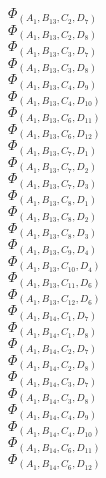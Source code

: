 \documentclass[14pt]{article}
\begin{document}
    $\Phi_{({A}_{1}, {B}_{13}, {C}_{2}, {D}_{7})}$ \\ 
    $\Phi_{({A}_{1}, {B}_{13}, {C}_{2}, {D}_{8})}$ \\ 
    $\Phi_{({A}_{1}, {B}_{13}, {C}_{3}, {D}_{7})}$ \\ 
    $\Phi_{({A}_{1}, {B}_{13}, {C}_{3}, {D}_{8})}$ \\ 
    $\Phi_{({A}_{1}, {B}_{13}, {C}_{4}, {D}_{9})}$ \\ 
    $\Phi_{({A}_{1}, {B}_{13}, {C}_{4}, {D}_{10})}$ \\ 
    $\Phi_{({A}_{1}, {B}_{13}, {C}_{6}, {D}_{11})}$ \\ 
    $\Phi_{({A}_{1}, {B}_{13}, {C}_{6}, {D}_{12})}$ \\ 
    $\Phi_{({A}_{1}, {B}_{13}, {C}_{7}, {D}_{1})}$ \\ 
    $\Phi_{({A}_{1}, {B}_{13}, {C}_{7}, {D}_{2})}$ \\ 
    $\Phi_{({A}_{1}, {B}_{13}, {C}_{7}, {D}_{3})}$ \\ 
    $\Phi_{({A}_{1}, {B}_{13}, {C}_{8}, {D}_{1})}$ \\ 
    $\Phi_{({A}_{1}, {B}_{13}, {C}_{8}, {D}_{2})}$ \\ 
    $\Phi_{({A}_{1}, {B}_{13}, {C}_{8}, {D}_{3})}$ \\ 
    $\Phi_{({A}_{1}, {B}_{13}, {C}_{9}, {D}_{4})}$ \\ 
    $\Phi_{({A}_{1}, {B}_{13}, {C}_{10}, {D}_{4})}$ \\ 
    $\Phi_{({A}_{1}, {B}_{13}, {C}_{11}, {D}_{6})}$ \\ 
    $\Phi_{({A}_{1}, {B}_{13}, {C}_{12}, {D}_{6})}$ \\ 
    $\Phi_{({A}_{1}, {B}_{14}, {C}_{1}, {D}_{7})}$ \\ 
    $\Phi_{({A}_{1}, {B}_{14}, {C}_{1}, {D}_{8})}$ \\ 
    $\Phi_{({A}_{1}, {B}_{14}, {C}_{2}, {D}_{7})}$ \\ 
    $\Phi_{({A}_{1}, {B}_{14}, {C}_{2}, {D}_{8})}$ \\ 
    $\Phi_{({A}_{1}, {B}_{14}, {C}_{3}, {D}_{7})}$ \\ 
    $\Phi_{({A}_{1}, {B}_{14}, {C}_{3}, {D}_{8})}$ \\ 
    $\Phi_{({A}_{1}, {B}_{14}, {C}_{4}, {D}_{9})}$ \\ 
    $\Phi_{({A}_{1}, {B}_{14}, {C}_{4}, {D}_{10})}$ \\ 
    $\Phi_{({A}_{1}, {B}_{14}, {C}_{6}, {D}_{11})}$ \\ 
    $\Phi_{({A}_{1}, {B}_{14}, {C}_{6}, {D}_{12})}$ \\ 
\end{document}
